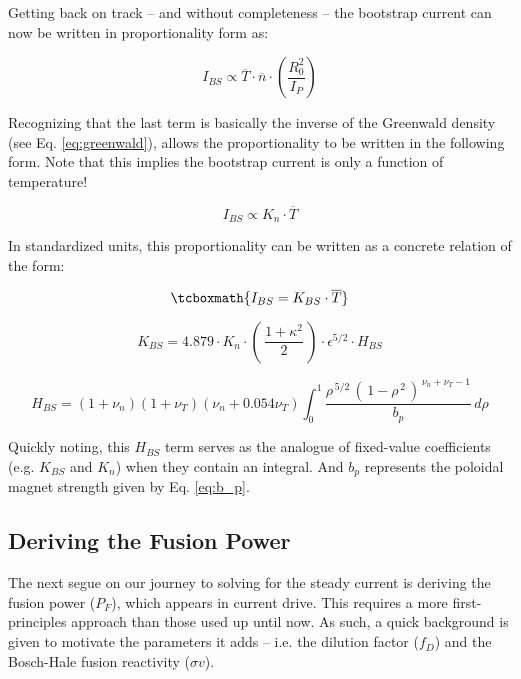 Getting back on track -- and without completeness -- the bootstrap current can now be written in proportionality form as:

\begin{equation}
	I_{BS} \propto \overline T \cdot \overline n \cdot \left( \frac{R_0^2}{I_P} \right)
\end{equation}

Recognizing that the last term is basically the inverse of the Greenwald density (see Eq. \ref{eq:greenwald}), allows the proportionality to be written in the following form. Note that this implies the bootstrap current is only a function of temperature!

\begin{equation}
	I_{BS} \propto K_n \cdot \overline T
\end{equation}

In standardized units, this proportionality can be written as a concrete relation of the form:

\begin{equation}
	\label{eq:ibs}
	\tcboxmath{
	I_{BS} = K_{BS} \cdot \overline T
	}
\end{equation}

\begin{equation}
  K_{BS} = 4.879 \cdot  K_n \cdot \left( \, \frac{1+\kappa^2}{2} \, \right) \cdot \epsilon^{5/2} \cdot H_{BS}
\end{equation}

\begin{equation}
  H_{BS} = ( 1 + \nu_n ) ( 1 + \nu_T ) ( \nu_n + 0.054 \nu_T ) \int_0^1 \frac{ \rho^{\,5/2} \, ( \, 1 - \rho^{\,2} \, )^{\, \nu_n + \nu_T - 1} }{b_p} \, d\rho
\end{equation}

Quickly noting, this $H_{BS}$ term serves as the analogue of fixed-value coefficients (e.g. $K_{BS}$ and $K_n$) when they contain an integral. And $b_p$ represents the poloidal magnet strength given by Eq. \ref{eq:b_p}.

\subsection{Deriving the Fusion Power}

The next segue on our journey to solving for the steady current is deriving the fusion power ($P_F$), which appears in current drive. This requires a more first-principles approach than those used up until now. As such, a quick background is given to motivate the parameters it adds -- i.e. the dilution factor ($f_{D}$) and the Bosch-Hale fusion reactivity ($\sigma v$).

